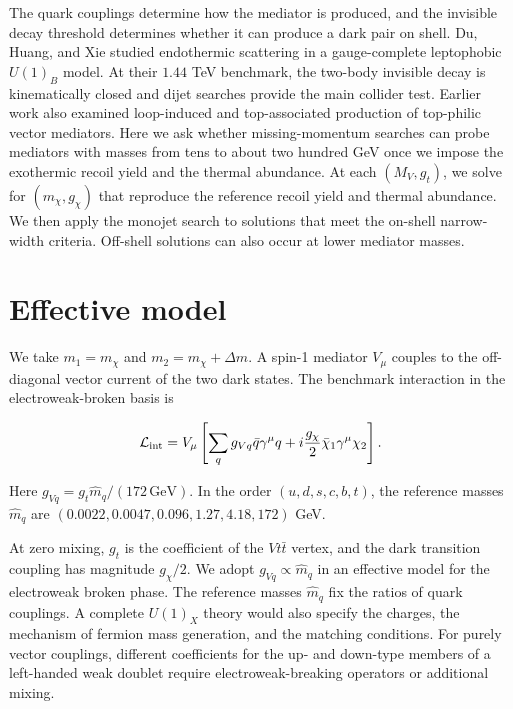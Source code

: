 \documentclass[aps,prd,reprint,superscriptaddress,longbibliography,floatfix]{revtex4-2}
\begin{document}
The quark couplings determine how the mediator is produced, and the invisible decay threshold determines whether it can produce a dark pair on shell. Du, Huang, and Xie studied endothermic scattering in a gauge-complete leptophobic $U(1)_B$ model. At their $1.44$ TeV benchmark, the two-body invisible decay is kinematically closed and dijet searches provide the main collider test. Earlier work also examined loop-induced and top-associated production of top-philic vector mediators. Here we ask whether missing-momentum searches can probe mediators with masses from tens to about two hundred GeV once we impose the exothermic recoil yield and the thermal abundance. At each $(M_V,g_t)$, we solve for $(m_\chi,g_\chi)$ that reproduce the reference recoil yield and thermal abundance. We then apply the monojet search to solutions that meet the on-shell narrow-width criteria. Off-shell solutions can also occur at lower mediator masses. \cite{du2026,cox2016}

\section{Effective model}
\label{sec:model}

We take $m_1=m_\chi$ and $m_2=m_\chi+\Delta m$. A spin-1 mediator $V_\mu$ couples to the off-diagonal vector current of the two dark states. The benchmark interaction in the electroweak-broken basis is

\begin{equation}
\label{eq:interaction}
\mathcal L_{\rm int}=V_\mu\left[\sum_q g_{Vq}\bar q\gamma^\mu q
+i\frac{g_\chi}{2}\bar\chi_1\gamma^\mu\chi_2\right].
\end{equation}

Here $g_{Vq}=g_t\widehat m_q/(172\,\mathrm{GeV})$. In the order
$(u,d,s,c,b,t)$, the reference masses $\widehat m_q$ are
$(0.0022,0.0047,0.096,1.27,4.18,172)$ GeV.

At zero mixing, $g_t$ is the coefficient of the $Vt\bar t$ vertex, and the dark transition coupling has magnitude $g_\chi/2$. We adopt $g_{Vq}\propto\widehat m_q$ in an effective model for the electroweak broken phase. The reference masses $\widehat m_q$ fix the ratios of quark couplings. A complete $U(1)_X$ theory would also specify the charges, the mechanism of fermion mass generation, and the matching conditions. For purely vector couplings, different coefficients for the up- and down-type members of a left-handed weak doublet require electroweak-breaking operators or additional mixing. \cite{kahlhoefer2016,deramo2016}
\end{document}
